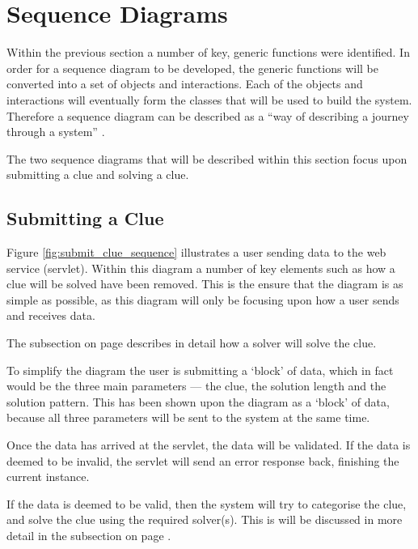 \section{Sequence Diagrams}
\label{sec:sequence_diagrams}

Within the previous  section a number of key, generic 
functions were identified. In order for a sequence diagram to be developed, 
the generic functions will be converted into a set of objects and interactions.
Each of the objects and interactions will eventually form the classes that will 
be used to build the system. Therefore a sequence diagram can be described as 
a ``way of describing a journey through a system'' \citep{lunn03}.

The two sequence diagrams that will be described within this section focus upon 
submitting a clue and solving a clue.


\subsection{Submitting a Clue}
\label{sub:submitting_a_clue}

Figure \ref{fig:submit_clue_sequence} illustrates a user sending data to the 
web service (servlet). Within this diagram a number of key elements such as how
a clue will be solved have been removed. This is the ensure that the diagram is 
as simple as possible, as this diagram will only be focusing upon how a user 
sends and receives data. 

The  subsection on page 
\pageref{fig:submit_clue_sequence} describes in detail how a solver will solve 
the clue.

To simplify the diagram the user is submitting a `block' of data, which in fact 
would be the three main parameters --- the clue, the solution length and the 
solution pattern. This has been shown upon the diagram as a `block' of data, 
because all three parameters will be sent to the system at the same time.

Once the data has arrived at the servlet, the data will be validated. If the 
data is deemed to be invalid, the servlet will send an error response back, 
finishing the current instance.

If the data is deemed to be valid, then the system will try to categorise the 
clue, and solve the clue using the required solver(s). This is will be discussed
in more detail in the  subsection on page 
\pageref{fig:submit_clue_sequence}.


